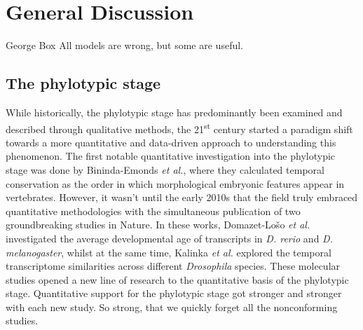\chapter{General Discussion}\thumbforchapter
\newpage

\begin{shadequote}[c]{George Box}
All models are wrong, but some are useful.
\end{shadequote}

\section{The phylotypic stage}

While historically, the phylotypic stage has predominantly been examined and described through qualitative methods, the 21\textsuperscript{st} century started a paradigm shift towards a more quantitative and data-driven approach to understanding this phenomenon\cite{Chan2021}. The first notable quantitative investigation into the phylotypic stage was done by Bininda-Emonds \textit{et al.}, where they calculated temporal conservation as the order in which morphological embryonic features appear in vertebrates. However, it wasn't until the early 2010s that the field truly embraced quantitative methodologies with the simultaneous publication of two groundbreaking studies in Nature\cite{Kalinka2010, DomazetLoso2010}. In these works, Domazet-Lošo \textit{et al.} investigated the average developmental age of transcripts in \textit{D. rerio} and \textit{D. melanogaster}, whilst at the same time, Kalinka \textit{et al.} explored the temporal transcriptome similarities across different \textit{Drosophila} species. These molecular studies opened a new line of research to the quantitative basis of the phylotypic stage. Quantitative support for the phylotypic stage got stronger and stronger with each new study. So strong, that we quickly forget all the nonconforming studies.

